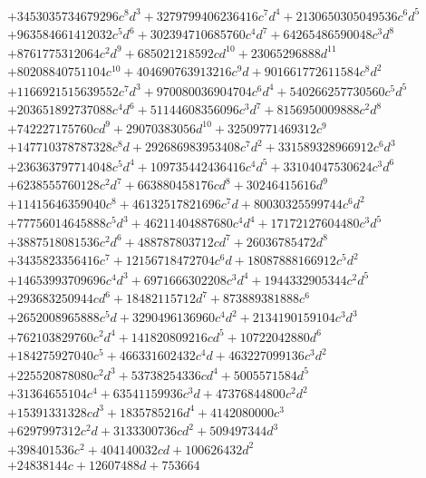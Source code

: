 {\begin{align*}
&+3453035734679296c^{8}d^{3}+3279799406236416c^{7}d^{4}+2130650305049536c^{6}d^{5}\\
&+963584661412032c^{5}d^{6}+302394710685760c^{4}d^{7}+64265486590048c^{3}d^{8}\\
&+8761775312064c^{2}d^{9}+685021218592cd^{10}+23065296888d^{11}\\
&+80208840751104c^{10}+404690763913216c^{9}d+901661772611584c^{8}d^{2}\\
&+1166921515639552c^{7}d^{3}+970080036904704c^{6}d^{4}+540266257730560c^{5}d^{5}\\
&+203651892737088c^{4}d^{6}+51144608356096c^{3}d^{7}+8156950009888c^{2}d^{8}\\
&+742227175760cd^{9}+29070383056d^{10}+32509771469312c^{9}\\
&+147710378787328c^{8}d+292686983953408c^{7}d^{2}+331589328966912c^{6}d^{3}\\
&+236363797714048c^{5}d^{4}+109735442436416c^{4}d^{5}+33104047530624c^{3}d^{6}\\
&+6238555760128c^{2}d^{7}+663880458176cd^{8}+30246415616d^{9}\\
&+11415646359040c^{8}+46132517821696c^{7}d+80030325599744c^{6}d^{2}\\
&+77756014645888c^{5}d^{3}+46211404887680c^{4}d^{4}+17172127604480c^{3}d^{5}\\
&+3887518081536c^{2}d^{6}+488787803712cd^{7}+26036785472d^{8}\\
&+3435823356416c^{7}+12156718472704c^{6}d+18087888166912c^{5}d^{2}\\
&+14653993709696c^{4}d^{3}+6971666302208c^{3}d^{4}+1944332905344c^{2}d^{5}\\
&+293683250944cd^{6}+18482115712d^{7}+873889381888c^{6}\\
&+2652008965888c^{5}d+3290496136960c^{4}d^{2}+2134190159104c^{3}d^{3}\\
&+762103829760c^{2}d^{4}+141820809216cd^{5}+10722042880d^{6}\\
&+184275927040c^{5}+466331602432c^{4}d+463227099136c^{3}d^{2}\\
&+225520878080c^{2}d^{3}+53738254336cd^{4}+5005571584d^{5}\\
&+31364655104c^{4}+63541159936c^{3}d+47376844800c^{2}d^{2}\\
&+15391331328cd^{3}+1835785216d^{4}+4142080000c^{3}\\
&+6297997312c^{2}d+3133300736cd^{2}+509497344d^{3}\\
&+398401536c^{2}+404140032cd+100626432d^{2}\\
&+24838144c+12607488d+753664
\end{align*}
}

